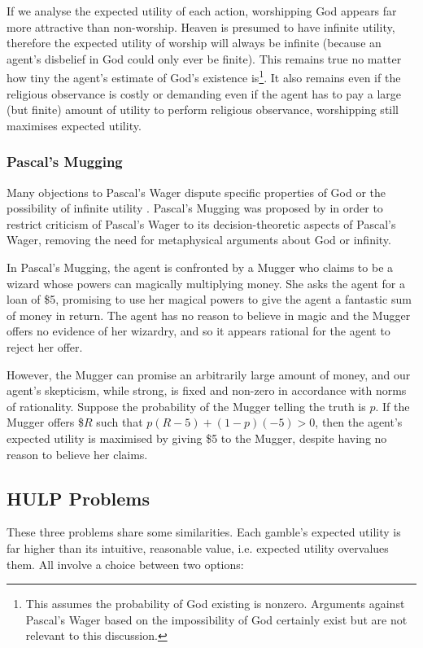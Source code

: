 \documentclass{article}
\begin{document}
If we analyse the expected utility of each action, worshipping God appears far more attractive than non-worship. Heaven is presumed to have infinite utility, therefore the expected utility of worship will always be infinite (because an agent's disbelief in God could only ever be finite). This remains true no matter how tiny the agent's estimate of God's existence is\footnote{This assumes the probability of God existing is nonzero. Arguments against Pascal's Wager based on the impossibility of God certainly exist \citep{oppy1991rescher} but are not relevant to this discussion.}. It also remains even if the religious observance is costly or demanding \textemdash{} even if the agent has to pay a large (but finite) amount of utility to perform religious observance, worshipping still maximises expected utility.

\subsubsection {Pascal's Mugging}
Many objections to Pascal's Wager dispute specific properties of God \citep{mackie1990miracle} or the possibility of infinite utility \citep{mcclennen1994pascal}. Pascal's Mugging was proposed by \citep{bostrom2009pascal} in order to restrict criticism of Pascal's Wager to its decision-theoretic aspects of Pascal's Wager, removing the need for metaphysical arguments about God or infinity.

In Pascal's Mugging, the agent is confronted by a Mugger who claims to be a wizard whose powers can magically multiplying money. She asks the agent for a loan of \$5, promising to use her magical powers to give the agent a fantastic sum of money in return. The agent has no reason to believe in magic and the Mugger offers no evidence of her wizardry, and so it appears rational for the agent to reject her offer.

However, the Mugger can promise an arbitrarily large amount of money, and our agent's skepticism, while strong, is fixed and non-zero in accordance with norms of rationality. Suppose the probability of the Mugger telling the truth is \(p\). If the Mugger offers \$\(R\) such that \(p(R-5)+(1-p)(-5)>0\), then the agent's expected utility is maximised by giving \$5 to the Mugger, despite having no reason to believe her claims.

\subsection{HULP Problems}
These three problems share some similarities. Each gamble's expected utility is far higher than its intuitive, reasonable value, i.e. expected utility overvalues them. All involve a choice between two options:
\end{document}
